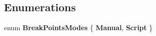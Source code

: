 \subsection*{Enumerations}
\begin{DoxyCompactItemize}
\item 
\hypertarget{namespacelib_watcher_dialog_a515294acba70df92413589ec2174151c}{enum {\bfseries Break\+Points\+Modes} \{ {\bfseries Manual}, 
{\bfseries Script}
 \}}\label{namespacelib_watcher_dialog_a515294acba70df92413589ec2174151c}

\end{DoxyCompactItemize}
